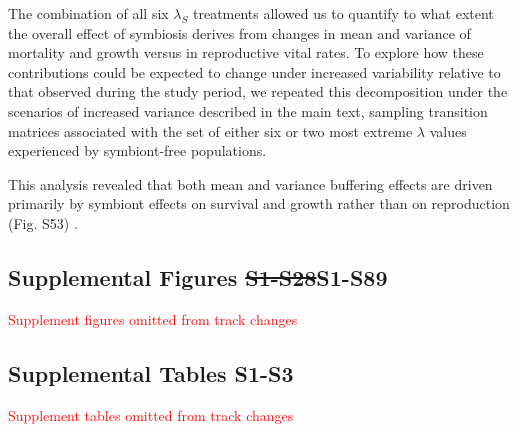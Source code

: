 \documentclass[lineno,sn-nature]{sn-jnl}%
\providecommand{\DIFadd}[1]{{\protect\color{blue}#1}} %
\providecommand{\DIFdel}[1]{{\protect\color{red}\protect\scriptsize\sout{#1}}}
\providecommand{\DIFadd}[1]{{\protect\color{blue}\uwave{#1}}} %
\providecommand{\DIFdel}[1]{{\protect\color{red}\sout{#1}}}                      %
\providecommand{\DIFaddbegin}{} %
\providecommand{\DIFaddend}{} %
\providecommand{\DIFdelbegin}{} %
\providecommand{\DIFdelend}{} %
\newcommand{\DIFscaledelfig}{0.5}
\newlength{\DIFdelgraphicswidth} %
\newlength{\DIFdelgraphicsheight} %
\newcommand{\DIFaddincludegraphics}[2][]{{\color{blue}\fbox{\DIFOincludegraphics[#1]{#2}}}} %
\newcommand{\DIFdelincludegraphics}[2][]{%
\sbox{\DIFdelgraphicsbox}{\DIFOincludegraphics[#1]{#2}}%
\settoboxwidth{\DIFdelgraphicswidth}{\DIFdelgraphicsbox} %
\settoboxtotalheight{\DIFdelgraphicsheight}{\DIFdelgraphicsbox} %
\scalebox{\DIFscaledelfig}{%
\parbox[b]{\DIFdelgraphicswidth}{\usebox{\DIFdelgraphicsbox}\\[-\baselineskip] \rule{\DIFdelgraphicswidth}{0em}}\llap{\resizebox{\DIFdelgraphicswidth}{\DIFdelgraphicsheight}{%
\setlength{\unitlength}{\DIFdelgraphicswidth}%
\begin{picture}(1,1)%
\thicklines\linethickness{2pt} %
{\color[rgb]{1,0,0}\put(0,0){\framebox(1,1){}}}%
{\color[rgb]{1,0,0}\put(0,0){\line( 1,1){1}}}%
{\color[rgb]{1,0,0}\put(0,1){\line(1,-1){1}}}%
\end{picture}%
}\hspace*{3pt}}} %
} %
\DeclareRobustCommand{\DIFaddbegin}{\DIFOaddbegin \let\includegraphics\DIFaddincludegraphics} %
\DeclareRobustCommand{\DIFaddend}{\DIFOaddend \let\includegraphics\DIFOincludegraphics} %
\DeclareRobustCommand{\DIFdelbegin}{\DIFOdelbegin \let\includegraphics\DIFdelincludegraphics} %
\DeclareRobustCommand{\DIFdelend}{\DIFOaddend \let\includegraphics\DIFOincludegraphics} %
\begin{document}
\begin{appendices}
{	\DIFadd{The combination of all six $\lambda_S$ treatments allowed us to quantify to what extent the overall effect of symbiosis derives from changes in mean and variance of mortality and growth versus in reproductive vital rates. 
	To explore how these contributions could be expected to change under increased variability relative to that observed during the study period, we repeated this decomposition under the scenarios of increased variance described in the main text, sampling transition matrices associated with the set of either six or two most extreme $\lambda$ values experienced by symbiont-free populations.

}

	\DIFadd{This analysis revealed that both mean and variance buffering effects are driven primarily by symbiont effects on survival and growth rather than on reproduction (Fig. S53) .
}}
\DIFaddend \newpage

\subsection*{Supplemental Figures \DIFdelbegin \DIFdel{S1-S28}\DIFdelend \DIFaddbegin \DIFadd{S1-S89}\DIFaddend }\label{secS_figs}

\renewcommand\thefigure{S\arabic{figure}}   

\DIFaddbegin \DIFadd{\textcolor{red}{Supplement figures omitted from track changes}

}

\DIFaddend \newpage

\subsection*{Supplemental Tables S1-S3}

\renewcommand\thetable{S\arabic{table}}   
\DIFaddbegin \DIFadd{\textcolor{red}{Supplement tables omitted from track changes}

}\DIFaddend 





\end{appendices}
\end{document}
